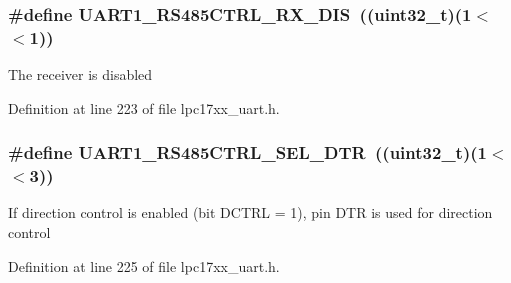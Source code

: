\hypertarget{group___u_a_r_t___private___macros_gad46c85dd9ed07459a63a886052e53404}{
\subsubsection[{\-U\-A\-R\-T1\-\_\-\-R\-S485\-C\-T\-R\-L\-\_\-\-R\-X\-\_\-\-D\-I\-S}]{\setlength{\rightskip}{0pt plus 5cm}\#define {\bf \-U\-A\-R\-T1\-\_\-\-R\-S485\-C\-T\-R\-L\-\_\-\-R\-X\-\_\-\-D\-I\-S}~((uint32\-\_\-t)(1$<$$<$1))}}\label{group___u_a_r_t___private___macros_gad46c85dd9ed07459a63a886052e53404}
\-The receiver is disabled 

\-Definition at line 223 of file lpc17xx\-\_\-uart.\-h.

\hypertarget{group___u_a_r_t___private___macros_gacb179ac97fb8aacbea2cf116bc671477}{
\subsubsection[{\-U\-A\-R\-T1\-\_\-\-R\-S485\-C\-T\-R\-L\-\_\-\-S\-E\-L\-\_\-\-D\-T\-R}]{\setlength{\rightskip}{0pt plus 5cm}\#define {\bf \-U\-A\-R\-T1\-\_\-\-R\-S485\-C\-T\-R\-L\-\_\-\-S\-E\-L\-\_\-\-D\-T\-R}~((uint32\-\_\-t)(1$<$$<$3))}}\label{group___u_a_r_t___private___macros_gacb179ac97fb8aacbea2cf116bc671477}
\-If direction control is enabled (bit \-D\-C\-T\-R\-L = 1), pin \-D\-T\-R is used for direction control 

\-Definition at line 225 of file lpc17xx\-\_\-uart.\-h.

